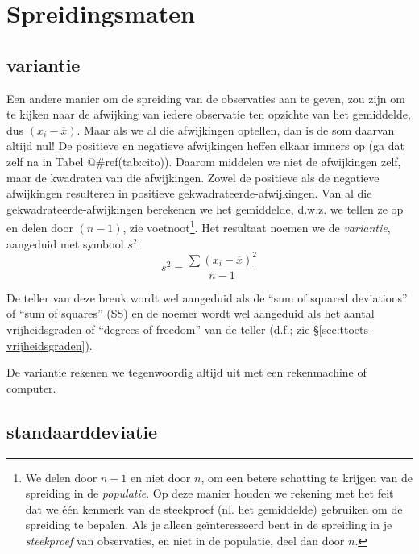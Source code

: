 \documentclass[
]{book}
\begin{document}
\hypertarget{sec:spreidingsmaten}{%
\section{Spreidingsmaten}\label{sec:spreidingsmaten}}

\hypertarget{sec:variantie}{%
\subsection{variantie}\label{sec:variantie}}

Een andere
manier om de spreiding van de observaties aan te geven, zou zijn om te
kijken naar de afwijking van iedere observatie ten opzichte van het
gemiddelde, dus \((x_i-\overline{x})\). Maar als we al die afwijkingen
optellen, dan is de som daarvan altijd nul! De positieve en negatieve
afwijkingen heffen elkaar immers op (ga dat zelf na in
Tabel @\#ref(tab:cito)).
Daarom middelen we niet de afwijkingen zelf, maar de kwadraten van die
afwijkingen. Zowel de positieve als de negatieve afwijkingen resulteren
in positieve gekwadrateerde-afwijkingen. Van al die
gekwadrateerde-afwijkingen berekenen we het gemiddelde, d.w.z. we tellen
ze op en delen door \((n-1)\), zie voetnoot\footnote{We delen door \(n-1\) en niet door \(n\), om een betere schatting te krijgen van de spreiding in de \emph{populatie}. Op deze manier houden we rekening met het feit dat we één kenmerk van de steekproef (nl. het gemiddelde) gebruiken om de spreiding te bepalen. Als je alleen geïnteresseerd bent in de spreiding in je \emph{steekproef} van observaties, en niet in de populatie, deel dan door \(n\).}. Het resultaat noemen we
de \emph{variantie}, aangeduid met symbool \(s^2\):
\begin{equation}
  s^2 = \frac{ \sum (x_i - \overline{x})^2 } {n-1}
  \label{eq:variantie}
\end{equation}

De teller van
deze breuk wordt wel aangeduid als de ``sum of squared deviations'' of
``sum of squares'' (SS) en de noemer wordt wel aangeduid als het aantal
vrijheidsgraden of ``degrees of freedom'' van de teller (d.f.; zie
§\ref{sec:ttoets-vrijheidsgraden}).

De variantie rekenen we tegenwoordig altijd uit met een rekenmachine of
computer.

\hypertarget{sec:standaarddeviatie}{%
\subsection{standaarddeviatie}\label{sec:standaarddeviatie}}
\end{document}
